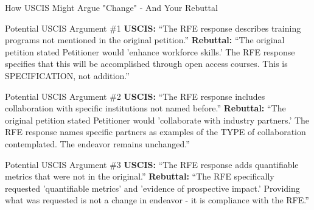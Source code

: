 \documentclass[11pt]{beamer}
\begin{document}
	\begin{frame}{How USCIS Might Argue "Change" - And Your Rebuttal}
		\scriptsize
		\begin{block}{Potential USCIS Argument \#1}
			\textbf{USCIS:} ``The RFE response describes training programs not mentioned in the original petition.''
			\vspace{0.1cm}
			\textbf{Rebuttal:} ``The original petition stated Petitioner would 'enhance workforce skills.' The RFE response specifies that this will be accomplished through open access courses. This is SPECIFICATION, not addition.''
		\end{block}
		\begin{block}{Potential USCIS Argument \#2}
			\textbf{USCIS:} ``The RFE response includes collaboration with specific institutions not named before.''
			\vspace{0.1cm}
			\textbf{Rebuttal:} ``The original petition stated Petitioner would 'collaborate with industry partners.' The RFE response names specific partners as examples of the TYPE of collaboration contemplated. The endeavor remains unchanged.''
		\end{block}
		\begin{block}{Potential USCIS Argument \#3}
			\textbf{USCIS:} ``The RFE response adds quantifiable metrics that were not in the original.''
			\vspace{0.1cm}
			\textbf{Rebuttal:} ``The RFE specifically requested 'quantifiable metrics' and 'evidence of prospective impact.' Providing what was requested is not a change in endeavor - it is compliance with the RFE.''
		\end{block}
	\end{frame}
	
\end{document}
